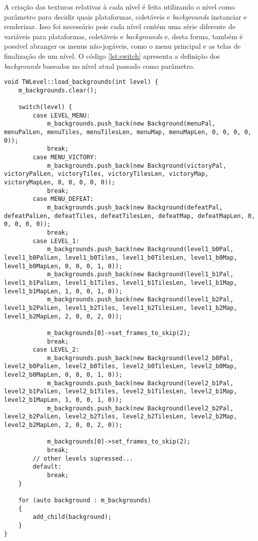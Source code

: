 A criação das texturas relativas à cada nível é feita utilizando o nível como parâmetro para decidir quais plataformas, coletáveis e \textit{backgrounds} instanciar e renderizar. Isso foi necessário pois cada nível contém uma série diferente de variáveis para plataformas, coletáveis e \textit{backgrounds} e, desta forma, também é possível abranger os menus não-jogáveis, como o menu principal e as telas de finalização de um nível. O código \ref{lst:switch} apresenta a definição dos \textit{backgrounds} baseados no nível atual passado como parâmetro.

\begin{lstlisting}[label={lst:switch},caption={Definição dos \textit{backgrounds} baseado no nível passado.}]
void TWLevel::load_backgrounds(int level) {
    m_backgrounds.clear();

    switch(level) {
        case LEVEL_MENU:
            m_backgrounds.push_back(new Background(menuPal, menuPalLen, menuTiles, menuTilesLen, menuMap, menuMapLen, 0, 0, 0, 0, 0));
            break;
        case MENU_VICTORY:
            m_backgrounds.push_back(new Background(victoryPal, victoryPalLen, victoryTiles, victoryTilesLen, victoryMap, victoryMapLen, 0, 0, 0, 0, 0));
            break;
        case MENU_DEFEAT:
            m_backgrounds.push_back(new Background(defeatPal, defeatPalLen, defeatTiles, defeatTilesLen, defeatMap, defeatMapLen, 0, 0, 0, 0, 0));
            break;
        case LEVEL_1:
            m_backgrounds.push_back(new Background(level1_b0Pal, level1_b0PalLen, level1_b0Tiles, level1_b0TilesLen, level1_b0Map, level1_b0MapLen, 0, 0, 0, 1, 0));
            m_backgrounds.push_back(new Background(level1_b1Pal, level1_b1PalLen, level1_b1Tiles, level1_b1TilesLen, level1_b1Map, level1_b1MapLen, 1, 0, 0, 1, 0));
            m_backgrounds.push_back(new Background(level1_b2Pal, level1_b2PalLen, level1_b2Tiles, level1_b2TilesLen, level1_b2Map, level1_b2MapLen, 2, 0, 0, 2, 0));

            m_backgrounds[0]->set_frames_to_skip(2);
            break;
        case LEVEL_2:
            m_backgrounds.push_back(new Background(level2_b0Pal, level2_b0PalLen, level2_b0Tiles, level2_b0TilesLen, level2_b0Map, level2_b0MapLen, 0, 0, 0, 1, 0));
            m_backgrounds.push_back(new Background(level2_b1Pal, level2_b1PalLen, level2_b1Tiles, level2_b1TilesLen, level2_b1Map, level2_b1MapLen, 1, 0, 0, 1, 0));
            m_backgrounds.push_back(new Background(level2_b2Pal, level2_b2PalLen, level2_b2Tiles, level2_b2TilesLen, level2_b2Map, level2_b2MapLen, 2, 0, 0, 2, 0));

            m_backgrounds[0]->set_frames_to_skip(2);
            break;
        // other levels supressed...
        default:
            break;
    }

    for (auto background : m_backgrounds)
    {
        add_child(background);
    }
}
\end{lstlisting}